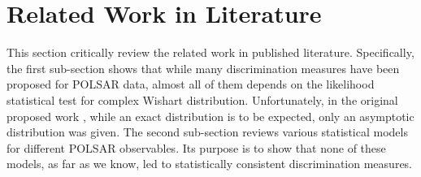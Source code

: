 \documentclass[journal]{IEEEtran}
\begin{document}

\section{Related Work in Literature}
\label{sec:lit_review}

This section critically review the related work in published literature.
Specifically, the first sub-section shows that while many discrimination measures have been proposed for POLSAR data,
  almost all of them depends on the likelihood statistical test for complex Wishart distribution.
Unfortunately, in the original proposed work \cite{Conradsen_2003_TGRS_4}, while an exact distribution is to be expected, only an asymptotic distribution was given.
The second sub-section reviews various statistical models for different POLSAR observables.
Its purpose is to show that none of these models, as far as we know, led to statistically consistent discrimination measures.
\end{document}
